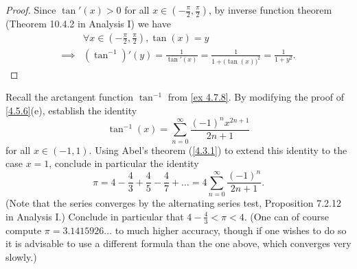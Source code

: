 \begin{proof}
  Since \(\tan'(x) > 0\) for all \(x \in (-\frac{\pi}{2}, \frac{\pi}{2})\), by inverse function theorem (Theorem 10.4.2 in Analysis I) we have
  \begin{align*}
             & \forall x \in (-\frac{\pi}{2}, \frac{\pi}{2}), \tan(x) = y                                    \\
    \implies & (\tan^{-1})'(y) = \frac{1}{\tan'(x)} = \frac{1}{1 + \big(\tan(x)\big)^2} = \frac{1}{1 + y^2}.
  \end{align*}
\end{proof}

\begin{exercise}\label{ex 4.7.9}
  Recall the arctangent function \(\tan^{-1}\) from \cref{ex 4.7.8}.
  By modifying the proof of \cref{4.5.6}(e), establish the identity
  \[
    \tan^{-1}(x) = \sum_{n = 0}^\infty \frac{(-1)^n x^{2n + 1}}{2n + 1}
  \]
  for all \(x \in (-1, 1)\).
  Using Abel's theorem (\cref{4.3.1}) to extend this identity to the case \(x = 1\), conclude in particular the identity
  \[
    \pi = 4 - \frac{4}{3} + \frac{4}{5} - \frac{4}{7} + \dots = 4 \sum_{n = 0}^\infty \frac{(-1)^n}{2n + 1}.
  \]
  (Note that the series converges by the alternating series test, Proposition 7.2.12 in Analysis I.)
  Conclude in particular that \(4 - \frac{4}{3} < \pi < 4\).
  (One can of course compute \(\pi = 3.1415926 \dots\) to much higher accuracy, though if one wishes to do so it is advisable to use a different formula than the one above, which converges very slowly.)
\end{exercise}

